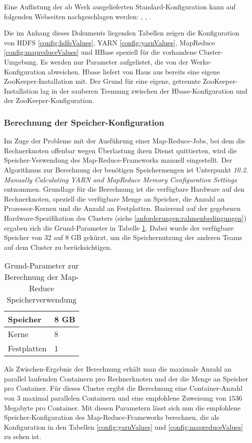 Eine Auflistung der ab Werk ausgelieferten Standard-Konfiguration kann auf folgenden Webseiten nachgeschlagen werden:
\cite{hdfsDefault}, \cite{yarnDefault}, \cite{mapreduceDefault} \cite{hbaseConfig}.

Die im Anhang dieses Dokuments liegenden Tabellen zeigen die Konfiguration von HDFS \ref{config:hdfsValues}, YARN \ref{config:yarnValues}, MapReduce \ref{config:mapreduceValues} und HBase 
speziell für die vorhandene Cluster-Umgebung. Es werden  nur Parameter aufgelistet, 
die von der Werks-Konfiguration abweichen.
Hbase liefert von Haus aus bereits eine eigene ZooKeeper-Installation mit. Der Grund für eine eigene, getrennte ZooKeeper-Installation lag in der sauberen Trennung zwischen der Hbase-Konfiguration und der ZooKeeper-Konfiguration. 

\subsubsection{Berechnung der Speicher-Konfiguration}
\label{anforderung:berechungSpeicher}
Im Zuge der Probleme mit der Ausführung einer Map-Reduce-Jobs, bei dem die Rechnerknoten
offenbar wegen Überlastung ihren Dienst quittierten, wird die Speicher-Verwendung
des Map-Reduce-Frameworks manuell eingestellt. Der Algorithmus zur Berechnung der 
benötigen Speichermengen ist \cite{memoryCal} Unterpunkt \textit{ 10.2. Manually Calculating YARN and MapReduce Memory Configuration Settings} entnommen.
Grundlage für die Berechnung ist die verfügbare Hardware auf den Rechnerknoten, speziell
die verfügbare Menge an Speicher, die Anzahl an Prozessor-Kernen und die Anzahl an 
Festplatten. Basierend auf der gegebenen Hardware-Spezifikation des Clusters 
(siehe \ref{anforderungen:rahmenbedingungen}) ergaben sich die Grund-Parameter in Tabelle
\ref{config:memoryCalculation}.
Dabei wurde der verfügbare Speicher von 32 auf 8 GB gekürzt, um die Speichernutzung der
anderen Teams auf dem Cluster zu berücksichtigen.

\begin{table}
	\begin{tabularx}{\textwidth}{|X|X|} \hline
	Speicher & 8 GB \\ \hline
	Kerne & 8 \\ \hline
	Festplatten & 1 \\ \hline
	\end{tabularx}
	\caption{Grund-Parameter zur Berechnung der Map-Reduce Speicherverwendung}
	\label{config:memoryCalculation}
\end{table}

Als Zwischen-Ergebnis der Berechnung erhält man die maximale Anzahl an parallel laufenden 
Containern pro Rechnerknoten und der die Menge an Speicher pro Container. Für dieses Cluster
ergibt die Berechnung eine Container-Anzahl von $3$ maximal parallelen Containern und 
eine empfohlene Zuweisung von $1536$ Megabyte pro Container. Mit diesen Parametern lässt 
sich nun die empfohlene Speicher-Konfiguration des Map-Reduce-Frameworks berechnen, die
als Konfiguration in den Tabellen \ref{config:yarnValues} und
 \ref{config:mapreduceValues} zu sehen ist.
